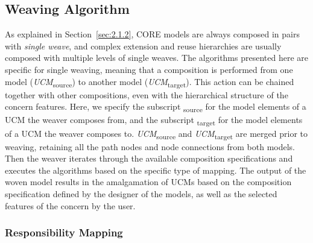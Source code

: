 \subsection{Weaving Algorithm}

As explained in Section~\ref{sec:2.1.2}, CORE models are always composed in pairs with \emph{single weave}, and complex extension and reuse hierarchies are usually composed with multiple levels of single weaves. The algorithms presented here are specific for single weaving, meaning that a composition is performed from one model (\emph{UCM}\textsubscript{source}) to another model (\emph{UCM}\textsubscript{target}). This action can be chained together with other compositions, even with the hierarchical structure of the concern features. Here, we specify the subscript \textsubscript{source} for the model elements of a UCM the weaver composes from, and the subscript \textsubscript{target} for the model elements of a UCM the weaver composes to. \emph{UCM}\textsubscript{source} and \emph{UCM}\textsubscript{target} are merged prior to weaving, retaining all the path nodes and node connections from both models. Then the weaver iterates through the available composition specifications and executes the algorithms based on the specific type of mapping. The output of the woven model results in the amalgamation of UCMs based on the composition specification defined by the designer of the models, as well as the selected features of the concern by the user.

\subsubsection{Responsibility Mapping} \label{sec:3.2.1.1}

